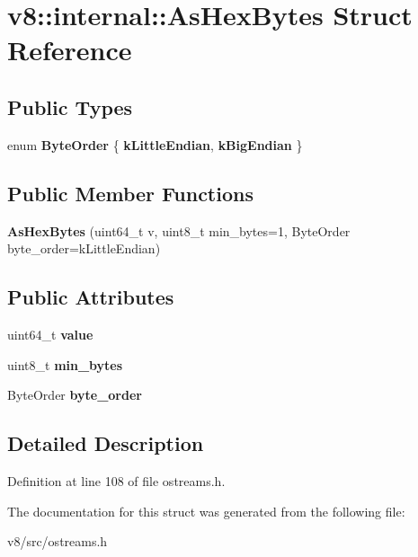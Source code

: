 \hypertarget{structv8_1_1internal_1_1AsHexBytes}{}\section{v8\+:\+:internal\+:\+:As\+Hex\+Bytes Struct Reference}
\label{structv8_1_1internal_1_1AsHexBytes}
\subsection*{Public Types}
\begin{DoxyCompactItemize}
\item 
\mbox{\label{structv8_1_1internal_1_1AsHexBytes_ad74f7dc2dca3929974255715a77f393c}} 
enum {\bfseries Byte\+Order} \{ {\bfseries k\+Little\+Endian}, 
{\bfseries k\+Big\+Endian}
 \}
\end{DoxyCompactItemize}
\subsection*{Public Member Functions}
\begin{DoxyCompactItemize}
\item 
\mbox{\label{structv8_1_1internal_1_1AsHexBytes_a34852e301e66c5a26b55a14a3eb06f6b}} 
{\bfseries As\+Hex\+Bytes} (uint64\+\_\+t v, uint8\+\_\+t min\+\_\+bytes=1, Byte\+Order byte\+\_\+order=k\+Little\+Endian)
\end{DoxyCompactItemize}
\subsection*{Public Attributes}
\begin{DoxyCompactItemize}
\item 
\mbox{\label{structv8_1_1internal_1_1AsHexBytes_a6a34660135f8a717f90df023f6fa8943}} 
uint64\+\_\+t {\bfseries value}
\item 
\mbox{\label{structv8_1_1internal_1_1AsHexBytes_a5e10a85a41f011e41f61cfa8dc24b1c2}} 
uint8\+\_\+t {\bfseries min\+\_\+bytes}
\item 
\mbox{\label{structv8_1_1internal_1_1AsHexBytes_a2a2b788ab718715659cf43239f96c1b9}} 
Byte\+Order {\bfseries byte\+\_\+order}
\end{DoxyCompactItemize}


\subsection{Detailed Description}


Definition at line 108 of file ostreams.\+h.



The documentation for this struct was generated from the following file\+:\begin{DoxyCompactItemize}
\item 
v8/src/ostreams.\+h\end{DoxyCompactItemize}
